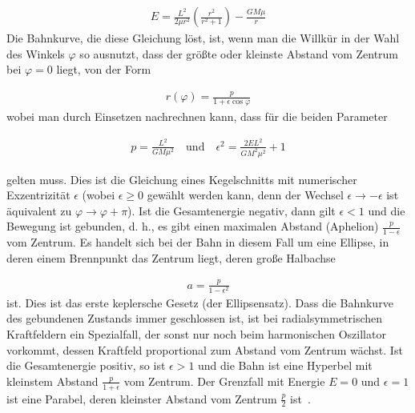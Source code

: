 \documentclass[a4paper,12pt,twoside]{article}
\begin{document}
\begin{align*}
	E = \frac{L^2}{2\mu r^2} \left( \frac{r^2}{r^2 + 1} \right) - \frac{GM\mu}{r}
\end{align*}
Die Bahnkurve, die diese Gleichung löst, ist, wenn man die Willkür in der Wahl des Winkels \( \varphi \) so ausnutzt, dass der größte oder kleinste Abstand vom Zentrum bei \( \varphi = 0 \) liegt, von der Form

\begin{align*}
	r(\varphi) = \frac{p}{1 + \epsilon \cos \varphi}
\end{align*}
wobei man durch Einsetzen nachrechnen kann, dass für die beiden Parameter

\begin{align*}
	p = \frac{L^2}{GM\mu^2} \quad \text{und} \quad \epsilon^2 = \frac{2E L^2}{GM^2 \mu^2} + 1
\end{align*}

gelten muss. Dies ist die Gleichung eines Kegelschnitts mit numerischer Exzentrizität \( \epsilon \) (wobei \( \epsilon \geq 0 \) gewählt werden kann, denn der Wechsel \( \epsilon \to -\epsilon \) ist äquivalent zu \( \varphi \to \varphi + \pi \)).
Ist die Gesamtenergie negativ, dann gilt \( \epsilon < 1 \) und die Bewegung ist gebunden, d. h., es gibt einen maximalen Abstand (Aphelion) \( \frac{p}{1 - \epsilon} \) vom Zentrum. Es handelt sich bei der Bahn in diesem Fall um eine Ellipse, in deren einem Brennpunkt das Zentrum liegt, deren große Halbachse

\begin{align*}
	a = \frac{p}{1 - \epsilon^2}
\end{align*}
ist. Dies ist das erste keplersche Gesetz (der Ellipsensatz). Dass die Bahnkurve des gebundenen Zustands immer geschlossen ist, ist bei radialsymmetrischen Kraftfeldern ein Spezialfall, der sonst nur noch beim harmonischen Oszillator vorkommt, dessen Kraftfeld proportional zum Abstand vom Zentrum wächst.
Ist die Gesamtenergie positiv, so ist \( \epsilon > 1 \) und die Bahn ist eine Hyperbel mit kleinstem Abstand \( \frac{p}{1 + \epsilon} \) vom Zentrum. Der Grenzfall mit Energie \( E = 0 \) und \( \epsilon = 1 \) ist eine Parabel, deren kleinster Abstand vom Zentrum \( \frac{p}{2} \) ist~\cite{Krug2011}.
\end{document}
